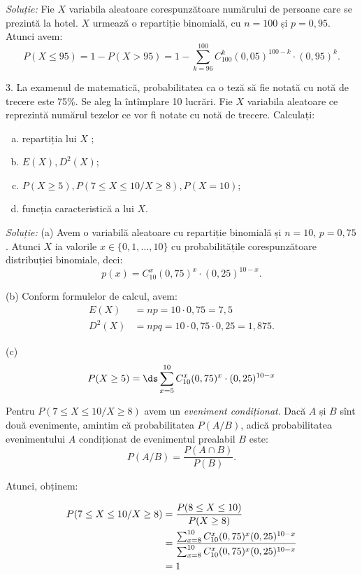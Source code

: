 \emph{Soluție:} Fie $ X $ variabila aleatoare corespunzătoare numărului de persoane
care se prezintă la hotel. $ X $ urmează o repartiție binomială, cu $ n = 100 $ și
$ p = 0,95 $. Atunci avem:
\[
  P(X \leq 95) = 1 - P(X > 95) = %
  1 - \sum_{k = 96}^{100} C_{100}^k (0,05)^{100-k} \cdot (0,95)^k.
\]

\vspace{0.3cm}

3. La examenul de matematică, probabilitatea ca o teză să fie notată cu notă de
trecere este 75\%. Se aleg la întîmplare 10 lucrări. Fie $ X $ variabila aleatoare
ce reprezintă numărul tezelor ce vor fi notate cu notă de trecere. Calculați:
\begin{enumerate}[(a)]
\item repartiția lui $ X $ ;
\item $ E(X), D^2(X) $;
\item $ P(X \geq 5), P(7 \leq X \leq 10 / X \geq 8), P(X = 10) $;
\item funcția caracteristică a lui $ X $.
\end{enumerate}

\emph{Soluție:} (a) Avem o variabilă aleatoare cu repartiție binomială și $ n = 10 $,
$ p = 0,75 $. Atunci $ X $ ia valorile $ x \in \{0, 1, \dots, 10 \}$ cu probabilitățile
corespunzătoare distribuției binomiale, deci:
\[
  p(x) = C_{10}^x (0,75)^x \cdot (0,25)^{10-x}.
\]

(b) Conform formulelor de calcul, avem:
\begin{align*}
  E(X) &= np = 10 \cdot 0,75 = 7,5 \\
  D^2(X) &= npq = 10 \cdot 0,75 \cdot 0,25 = 1,875.
\end{align*}

(c)
\[
  P(X \geq 5) = \ds\sum_{x = 5}^{10} C_{10}^x (0,75)^x \cdot (0,25)^{10-x}
\]

Pentru $ P(7 \leq X \leq 10 / X \geq 8) $ avem un \emph{eveniment condiționat}.
Dacă $ A $ și $ B $ sînt două evenimente, amintim că probabilitatea $ P(A/B) $,
adică probabilitatea evenimentului $ A $ condiționat de evenimentul prealabil $ B $
este:
\[
  P(A / B) = \frac{P(A \cap B)}{P(B)}.
\]

Atunci, obținem:

\begin{align*}
  P(7 \leq X \leq 10 / X \geq 8) &= \dfrac{P(8 \leq X \leq 10)}{P(X \geq 8)} \\
              &= \frac{\sum_{x = 8}^{10} C_{10}^x (0,75)^x (0,25)^{10-x}}{%
                \sum_{x = 8}^{10} C_{10}^x (0,75)^x (0,25)^{10-x}} \\
              &= 1
\end{align*}


